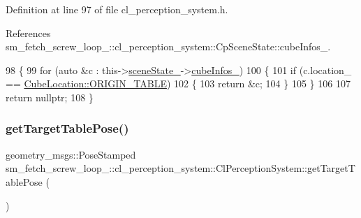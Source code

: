 Definition at line 97 of file cl\+\_\+perception\+\_\+system.\+h.



References sm\+\_\+fetch\+\_\+screw\+\_\+loop\+\_\+::cl\+\_\+perception\+\_\+system\+::\+Cp\+Scene\+State\+::cube\+Infos\+\_\+.


\begin{DoxyCode}
98             \{
99                 \textcolor{keywordflow}{for} (\textcolor{keyword}{auto} &c : this->\hyperlink{classsm__fetch__screw__loop__1_1_1cl__perception__system_1_1ClPerceptionSystem_a2a9472fe3838543666bd2eea5df0f2e6}{sceneState\_}->\hyperlink{classsm__fetch__screw__loop__1_1_1cl__perception__system_1_1CpSceneState_a518bc2132bcc8e88152549db120d7d29}{cubeInfos\_})
100                 \{
101                     \textcolor{keywordflow}{if} (c.location\_ == \hyperlink{namespacesm__fetch__screw__loop__1_1_1cl__perception__system_a8cdb75a4100a10a4a1c6034d9655088dae5ee34c3ef8ec4a46a00a218416c7b1d}{CubeLocation::ORIGIN\_TABLE})
102                     \{
103                         \textcolor{keywordflow}{return} &c;
104                     \}
105                 \}
106 
107                 \textcolor{keywordflow}{return} \textcolor{keyword}{nullptr};
108             \}
\end{DoxyCode}
\mbox{\label{classsm__fetch__screw__loop__1_1_1cl__perception__system_1_1ClPerceptionSystem_a11be4da365581400d03e897fa8171719}} 
\subsubsection{\texorpdfstring{get\+Target\+Table\+Pose()}{getTargetTablePose()}}
{\footnotesize\ttfamily geometry\+\_\+msgs\+::\+Pose\+Stamped sm\+\_\+fetch\+\_\+screw\+\_\+loop\+\_\+::cl\+\_\+perception\+\_\+system\+::\+Cl\+Perception\+System\+::get\+Target\+Table\+Pose (\begin{DoxyParamCaption}{ }\end{DoxyParamCaption})\hspace{0.3cm}{\ttfamily [inline]}}




